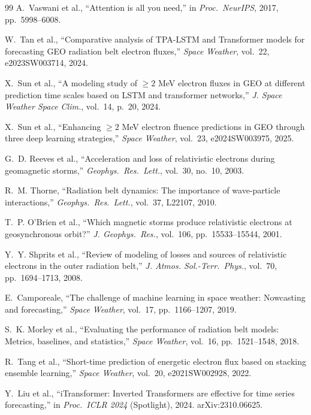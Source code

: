 \documentclass{ieeeaccess}
\begin{document}
\begin{thebibliography}{99}
A.~Vaswani et al., ``Attention is all you need,'' in \emph{Proc.\ NeurIPS},
2017, pp.~5998--6008.

W.~Tan et al., ``Comparative analysis of TPA-LSTM and Transformer models
for forecasting GEO radiation belt electron fluxes,'' \emph{Space Weather},
vol.~22, e2023SW003714, 2024.

X.~Sun et al., ``A modeling study of \(\ge2\) MeV electron fluxes in GEO
at different prediction time scales based on LSTM and transformer networks,''
\emph{J. Space Weather Space Clim.}, vol.~14, p.~20, 2024.

X.~Sun et al., ``Enhancing \(\ge2\) MeV electron fluence predictions in GEO
through three deep learning strategies,'' \emph{Space Weather}, vol.~23,
e2024SW003975, 2025.

G.~D. Reeves et al., ``Acceleration and loss of relativistic electrons
during geomagnetic storms,'' \emph{Geophys.\ Res.\ Lett.}, vol.~30,
no.~10, 2003.

R.~M. Thorne, ``Radiation belt dynamics: The importance of wave-particle
interactions,'' \emph{Geophys.\ Res.\ Lett.}, vol.~37, L22107, 2010.

T.~P. O'Brien et al., ``Which magnetic storms produce relativistic
electrons at geosynchronous orbit?'' \emph{J. Geophys.\ Res.},
vol.~106, pp.~15533--15544, 2001.

Y.~Y. Shprits et al., ``Review of modeling of losses and sources of
relativistic electrons in the outer radiation belt,'' \emph{J. Atmos.
Sol.-Terr.\ Phys.}, vol.~70, pp.~1694--1713, 2008.

E.~Camporeale, ``The challenge of machine learning in space weather:
Nowcasting and forecasting,'' \emph{Space Weather}, vol.~17, pp.~1166--1207,
2019.

S.~K. Morley et al., ``Evaluating the performance of radiation belt models:
Metrics, baselines, and statistics,'' \emph{Space Weather}, vol.~16,
pp.~1521--1548, 2018.

R.~Tang et al., ``Short-time prediction of energetic electron flux based
on stacking ensemble learning,'' \emph{Space Weather}, vol.~20,
e2021SW002928, 2022.

Y.~Liu et al., ``iTransformer: Inverted Transformers are effective for time
series forecasting,'' in \emph{Proc.\ ICLR 2024} (Spotlight), 2024.
arXiv:2310.06625.


\end{thebibliography}
\end{document}
